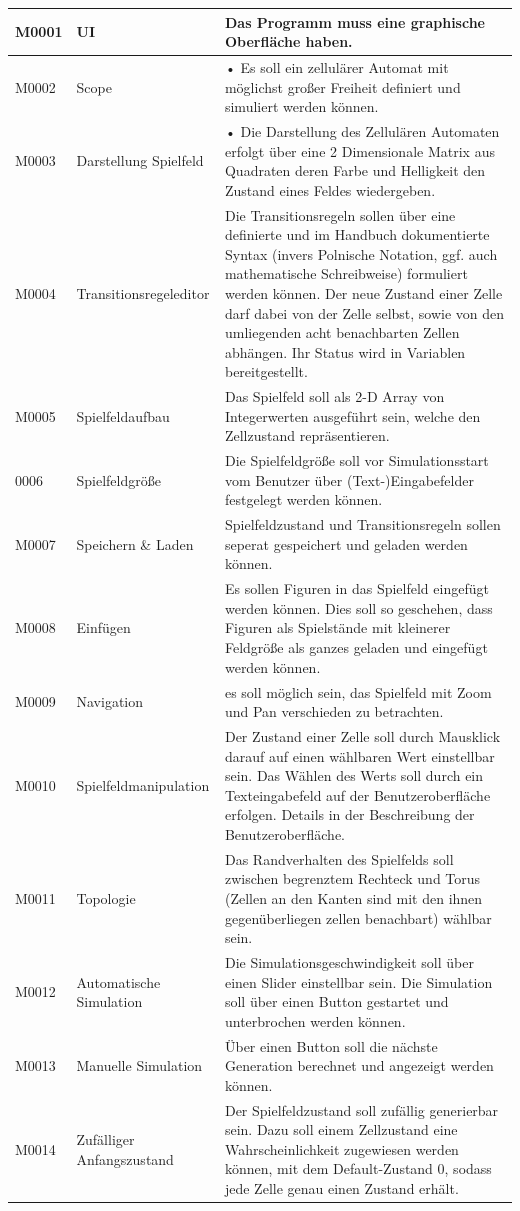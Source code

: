 \documentclass[11pt,a4paper]{article}
\begin{document}
\begin{longtable}[m]{|m{2.2cm}|m{4cm}|m{8cm}|}
\hline
M0001     & UI & Das Programm muss eine graphische Oberfläche haben.  \\
\hline
M0002 & Scope & •	Es soll ein zellulärer Automat mit möglichst großer Freiheit definiert und simuliert werden können.  \\
\hline
M0003 & Darstellung Spielfeld & •	Die Darstellung des Zellulären Automaten erfolgt über eine 2 Dimensionale Matrix aus Quadraten deren Farbe und Helligkeit den Zustand eines Feldes wiedergeben. \\
\hline
M0004 & Transitionsregeleditor & Die Transitionsregeln sollen über eine definierte und im Handbuch dokumentierte Syntax (invers Polnische Notation, ggf. auch mathematische Schreibweise) formuliert werden können. Der neue Zustand einer Zelle darf dabei von der Zelle selbst, sowie von den umliegenden acht benachbarten Zellen abhängen. Ihr Status wird in Variablen bereitgestellt.\\
\hline
M0005 & Spielfeldaufbau & Das Spielfeld soll als 2-D Array von Integerwerten ausgeführt sein, welche den Zellzustand repräsentieren.\\
\hline
0006 & Spielfeldgröße & Die Spielfeldgröße soll vor Simulationsstart vom Benutzer über (Text-)Eingabefelder festgelegt werden können.\\
\hline
M0007 & Speichern \& Laden & Spielfeldzustand und Transitionsregeln sollen seperat gespeichert und geladen werden können.  \\
\hline
M0008 & Einfügen & Es sollen Figuren in das Spielfeld eingefügt werden können. Dies soll so geschehen, dass Figuren als Spielstände mit kleinerer Feldgröße als ganzes geladen und eingefügt werden können. \\
\hline
M0009 & Navigation & es soll möglich sein, das Spielfeld mit Zoom und Pan verschieden zu betrachten. \\
\hline
M0010 & Spielfeldmanipulation & Der Zustand einer Zelle soll durch Mausklick darauf auf einen wählbaren Wert einstellbar sein. Das Wählen des Werts soll durch ein Texteingabefeld auf der Benutzeroberfläche erfolgen. Details in der Beschreibung der Benutzeroberfläche.\\
\hline
M0011 & Topologie & Das Randverhalten des Spielfelds soll zwischen begrenztem Rechteck und Torus (Zellen an den Kanten sind mit den ihnen gegenüberliegen zellen benachbart) wählbar sein.\\
\hline
M0012 & Automatische Simulation & Die Simulationsgeschwindigkeit soll über einen Slider einstellbar sein. Die Simulation soll über einen Button gestartet und unterbrochen werden können.\\
\hline
M0013 & Manuelle Simulation & Über einen Button soll die nächste Generation berechnet und angezeigt werden können. \\
\hline
M0014 & Zufälliger Anfangszustand & Der Spielfeldzustand soll zufällig generierbar sein. Dazu soll einem Zellzustand eine Wahrscheinlichkeit zugewiesen werden können, mit dem Default-Zustand 0, sodass jede Zelle genau einen Zustand erhält.\\


\end{longtable}
\end{document}
